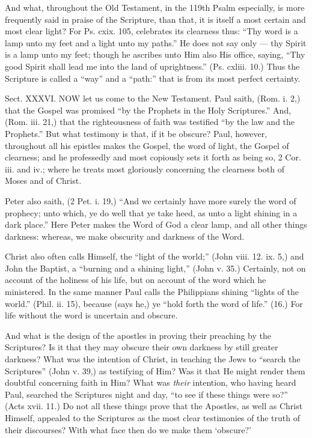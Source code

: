 And what, throughout the Old Testament, in the 119th Psalm especially, is more frequently said in praise of the Scripture, than that, it is itself a most certain and most clear light? For Ps. cxix. 105, celebrates its clearness thus: “Thy word is a lamp unto my feet and a light unto my paths.” He does not say only — thy Spirit is a lamp unto my feet; though he ascribes unto Him also His office, saying, “Thy good Spirit shall lead me into the land of uprightness.” (Ps. cxliii. 10.) Thus the Scripture is called a “way” and a “path:” that is from its most perfect certainty.


Sect. XXXVI. NOW let us come to the New Testament. Paul saith, (Rom. i. 2,) that the Gospel was promised “by the Prophets in the Holy Scriptures.” And, (Rom. iii. 21,) that the righteousness of faith was testified “by the law and the Prophets.” But what testimony is that, if it be obscure? Paul, however, throughout all his epistles makes the Gospel, the word of light, the Gospel of clearness; and he professedly and most copiously sets it forth as being so, 2 Cor. iii. and iv.; where he treats most gloriously concerning the clearness both of Moses and of Christ.

Peter also saith, (2 Pet. i. 19,) “And we certainly have more surely the word of prophecy; unto which, ye do well that ye take heed, as unto a light shining in a dark place.” Here Peter makes the Word of God a clear lamp, and all other things darkness: whereas, we make obscurity and darkness of the Word.

Christ also often calls Himself, the “light of the world;” (John viii. 12. ix. 5,) and John the Baptist, a “burning and a shining light,” (John v. 35.) Certainly, not on account of the holiness of his life, but on account of the word which he ministered. In the same manner Paul calls the Philippians shining “lights of the world.” (Phil. ii. 15), because (says he,) ye “hold forth the word of life.” (16.) For life without the word is uncertain and obscure.

And what is the design of the apostles in proving their preaching by the Scriptures? Is it that they may obscure their own darkness by still greater darkness? What was the intention of Christ, in teaching the Jews to “search the Scriptures” (John v. 39,) as testifying of Him? Was it that He might render them doubtful concerning faith in Him? What was \emph{their }intention, who having heard Paul, searched the Scriptures night and day, “to see if these things were so?” (Acts xvii. 11.) Do not all these things prove that the Apostles, as well as Christ Himself, appealed to the Scriptures as the most clear testimonies of the truth of their discourses? With what face then do we make them ‘obscure?’

